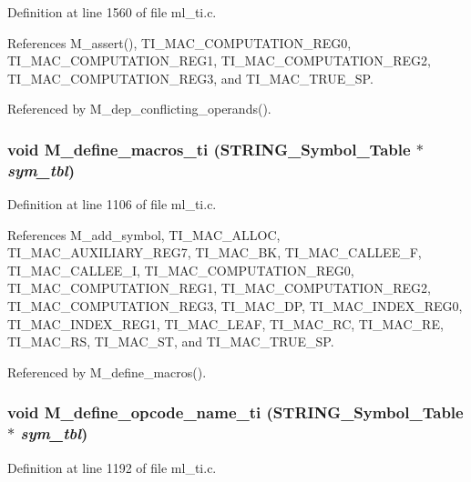 Definition at line 1560 of file ml\_\-ti.c.

References M\_\-assert(), TI\_\-MAC\_\-COMPUTATION\_\-REG0, TI\_\-MAC\_\-COMPUTATION\_\-REG1, TI\_\-MAC\_\-COMPUTATION\_\-REG2, TI\_\-MAC\_\-COMPUTATION\_\-REG3, and TI\_\-MAC\_\-TRUE\_\-SP.

Referenced by M\_\-dep\_\-conflicting\_\-operands().
\subsubsection{\setlength{\rightskip}{0pt plus 5cm}void M\_\-define\_\-macros\_\-ti (\bf{STRING\_\-Symbol\_\-Table} $\ast$ {\em sym\_\-tbl})}\label{ml__ti_8c_123b8338a580936f1b26d24c704ea303}




Definition at line 1106 of file ml\_\-ti.c.

References M\_\-add\_\-symbol, TI\_\-MAC\_\-ALLOC, TI\_\-MAC\_\-AUXILIARY\_\-REG7, TI\_\-MAC\_\-BK, TI\_\-MAC\_\-CALLEE\_\-F, TI\_\-MAC\_\-CALLEE\_\-I, TI\_\-MAC\_\-COMPUTATION\_\-REG0, TI\_\-MAC\_\-COMPUTATION\_\-REG1, TI\_\-MAC\_\-COMPUTATION\_\-REG2, TI\_\-MAC\_\-COMPUTATION\_\-REG3, TI\_\-MAC\_\-DP, TI\_\-MAC\_\-INDEX\_\-REG0, TI\_\-MAC\_\-INDEX\_\-REG1, TI\_\-MAC\_\-LEAF, TI\_\-MAC\_\-RC, TI\_\-MAC\_\-RE, TI\_\-MAC\_\-RS, TI\_\-MAC\_\-ST, and TI\_\-MAC\_\-TRUE\_\-SP.

Referenced by M\_\-define\_\-macros().
\subsubsection{\setlength{\rightskip}{0pt plus 5cm}void M\_\-define\_\-opcode\_\-name\_\-ti (\bf{STRING\_\-Symbol\_\-Table} $\ast$ {\em sym\_\-tbl})}\label{ml__ti_8c_d139005a4a1c4eb5e5dd85daa19231d0}




Definition at line 1192 of file ml\_\-ti.c.

